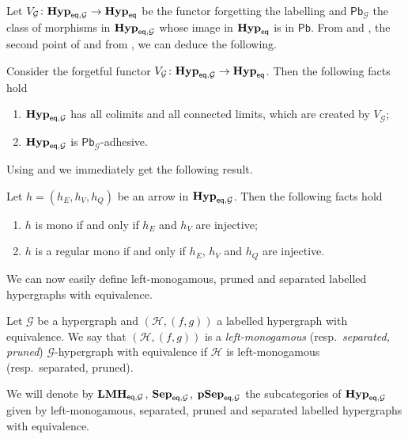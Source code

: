 \documentclass[3p]{elsarticle}
\newcommand{\pbc}{\mathsf{Pb}}
\newcommand{\eq}{\mathsf{eq}}
\newcommand{\catname}[1]{\textbf{\textup{#1}}}
\newcommand{\lmo}{\catname{LMH}}
\newcommand{\hyp}{\catname{Hyp}}
\newcommand{\pshyp}{\catname{pSep}}
\newcommand{\shyp}{\catname{Sep}}
\newcommand{\EqHyp}{\catname{Hyp}_{\mathsf{eq}}} %
\newcommand{\EqHyps}{\catname{Hyp}_{\mathsf{eq}, \mathcal{G}}}
\theoremstyle{remark}
\theoremstyle{definition}
\begin{document}
Let $V_\mathcal{G}\colon \EqHyps\to \EqHyp$ be the functor forgetting the labelling and $\pbc_\mathcal{G}$ the class of morphisms in $\EqHyps$ whose image in $\EqHyp$ is in $\pbc$. From  and , the second point of  and from , we can deduce the following.

\begin{prop}\label{prop:lim}Consider the forgetful functor $V_\mathcal{G}\colon \EqHyps\to \EqHyp$. Then the following facts hold
	\begin{enumerate}
		\item $\EqHyps$ has all colimits and all connected limits, which are created by $V_\mathcal{G}$;
		\item $\EqHyps$ is $\pbc_\mathcal{G}$-adhesive.
	\end{enumerate}
\end{prop}

Using  and  we immediately get the following result. 

\begin{cor}\label{prop:monos_in_eqhyps} Let $h=(h_{E}, h_V, h_Q)$ be an arrow in $\EqHyps$. Then the following facts hold
	\begin{enumerate}
		\item $h$ is mono if and only if $h_E$ and $h_V$ are injective;
		\item $h$ is a regular mono if and only if $h_E$, $h_V$ and $h_Q$ are injective.
	\end{enumerate}
\end{cor}


We can now easily define left-monogamous, pruned and separated labelled hypergraphs with equivalence.

\begin{defi}Let $\mathcal{G}$ be a hypergraph and $(\mathcal{H},(f,g))$ a labelled hypergraph with equivalence.  We say that $(\mathcal{H},(f,g))$ is a \emph{left-monogamous} (resp.~\emph{separated, pruned}) $\mathcal{G}$-hypergraph with equivalence if $\mathcal{H}$ is left-monogamous (resp.~separated, pruned).
	
	We will denote by $\lmo_{\eq, \mathcal{G}}$, $\shyp_{\eq, \mathcal{G}}$, $\pshyp_{\eq, \mathcal{G}}$ the subcategories of $\hyp_{\eq, \mathcal{G}}$ given by left-monogamous, separated, pruned  and separated labelled hypergraphs with equivalence.
 \end{defi}
 
\end{document}
